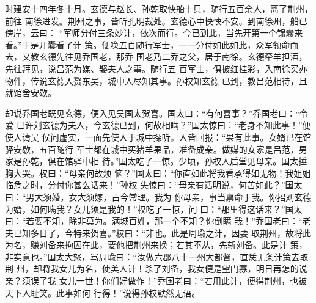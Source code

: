 时建安十四年冬十月。玄德与赵长、孙乾取快船十只，随行五百余人，离了荆州，前往
南徐进发。荆州之事，皆听孔明裁处。玄德心中怏怏不安。到南徐州，船已傍岸，云曰：
“军师分付三条妙计，依次而行。今已到此，当先开第一个锦囊来看。”于是开囊看了计
策。便唤五百随行军士，一一分付如此如此，众军领命而去，又教玄德先往见乔国老，那乔
国老乃二乔之父，居于南徐。玄德牵羊担酒，先往拜见，说吕范为媒、娶夫人之事。随行五
百军士，俱披红挂彩，入南徐买办物件，传说玄德入赘东吴，城中人尽知其事。孙权知玄德
已到，教吕范相待，且就馆舍安歇。

却说乔国老既见玄德，便入见吴国太贺喜。国太曰：“有何喜事？”乔国老曰：“令爱
已许刘玄德为夫人，今玄德已到，何故相瞒？”国太惊曰：“老身不知此事！”便使人请吴
侯问虚实，一面先使人于城中探听。人皆回报：“果有此事。女婿已在馆驿安歇，五百随行
军士都在城中买猪羊果品，准备成亲。做媒的女家是吕范，男家是孙乾，俱在馆驿中相
待。”国太吃了一惊。少顷，孙权入后堂见母亲。国太捶胸大哭。权曰：“母亲何故烦
恼？”国太曰：“你直如此将我看承得如无物！我姐姐临危之时，分付你甚么话来！”孙权
失惊曰：“母亲有话明说，何苦如此？”国太曰：“男大须婚，女大须嫁，古今常理。我为
你母亲，事当禀命于我。你招刘玄德为婿，如何瞒我？女儿须是我的！”权吃了一惊，问
曰：“那里得这话来？”国太曰：“若要不知，除非莫为。满城百姓，那一个不知？你倒瞒
我！”乔国老曰：“老夫已知多日了，今特来贺喜。”权曰：“非也。此是周瑜之计，因要
取荆州，故将此为名，赚刘备来拘囚在此，要他把荆州来换；若其不从，先斩刘备。此是计
策，非实意也。”国太大怒，骂周瑜曰：“汝做六郡八十一州大都督，直恁无条计策去取荆
州，却将我女儿为名，使美人计！杀了刘备，我女便是望门寡，明日再怎的说亲？须误了我
女儿一世！你们好做作！”乔国老曰：“若用此计，便得荆州，也被天下人耻笑。此事如何
行得！”说得孙权默然无语。

